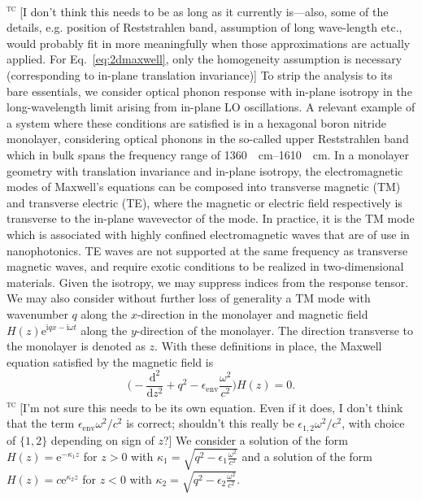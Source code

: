 \documentclass[aps,prb,twocolumn,
	           groupedaddress,superscriptaddress,
               amsfonts,amssymb,amsmath,floatfix,
	           citeautoscript]{revtex4-1}
\makeatletter
\newcommand{\iu}{\mathrm{i}}
\newcommand{\e}{\mathrm{e}}
\newcommand{\dd}{\mathrm{d}}
\newcommand{\eg}{e.g.\@\xspace}
\newcommand{\comment}[2]{%
    \ifbool{togglecomments}%
    {\textcolor{blue!70!black}{\small\textsf{%
    \textsuperscript{\textsc{\textsf{\MakeLowercase{#1}}}}%
    [#2]}}} %
    {}}     %
\newcommand{\remove}[1]{\ifbool{togglechanges}
    {}    %
    {\textcolor{red!70!black}{#1}}}
\makeatother
\begin{document}
\comment{tc}{I don't think this needs to be as long as it currently is---also, some of the details, \eg position of Reststrahlen band, assumption of long wave-length etc., would probably fit in more meaningfully when those approximations are actually applied. For Eq.~\eqref{eq:2dmaxwell}, only the homogeneity assumption is necessary (corresponding to in-plane translation invariance)}
To strip the analysis to its bare essentials, we consider optical phonon response with in-plane isotropy in the long-wavelength limit arising from in-plane LO oscillations. A relevant example of a system where these conditions are satisfied is in a hexagonal boron nitride monolayer, considering optical phonons in the so-called upper Reststrahlen band which in bulk spans the frequency range of \SIrange[range-phrase=\text{ to }]{1360}{1610}{\per\cm}. In a monolayer geometry with translation invariance and in-plane isotropy, the electromagnetic modes of Maxwell's equations can be composed into transverse magnetic (TM) and transverse electric (TE), where the magnetic or electric field respectively is transverse to the in-plane wavevector of the mode. In practice, it is the TM mode which is associated with highly confined electromagnetic waves that are of use in nanophotonics. TE waves are not supported at the same frequency as transverse magnetic waves, and require exotic conditions to be realized in two-dimensional materials. Given the isotropy, we may suppress indices from the response tensor. We may also consider without \remove{further} loss of generality a TM mode with wavenumber $q$ along the $x$-direction in the monolayer and magnetic field $H(z)\e^{\iu qx-\iu\omega t}$ along the $y$-direction of the monolayer. The direction transverse to the monolayer is denoted as $z$.  With these definitions in place, the Maxwell equation satisfied by the magnetic field is 
\begin{equation}\label{eq:2dmaxwell}
    \bigg(-\frac{\dd^2}{\dd{}z^2}+q^2-\epsilon_{\mathrm{env}}\frac{\omega^2}{c^2} \bigg)H(z) = 0.
\end{equation}
\comment{tc}{I'm not sure this needs to be its own equation. Even if it does, I don't think that the term $\epsilon_{\mathrm{env}}\omega^2/c^2$ is correct; shouldn't this really be $\epsilon_{1,2}\omega^2/c^2$, with choice of $\{1,2\}$ depending on sign of $z$?}
We consider a solution of the form $H(z) = \e^{-\kappa_1 z}$ for $z > 0$ with $\kappa_1 = \sqrt{q^2-\epsilon_1\frac{\omega^2}{c^2}}$ and a solution of the form $H(z) = c\e^{\kappa_2 z}$ for $z < 0$ with $\kappa_2 = \sqrt{q^2-\epsilon_2\frac{\omega^2}{c^2}}$. 
\end{document}
